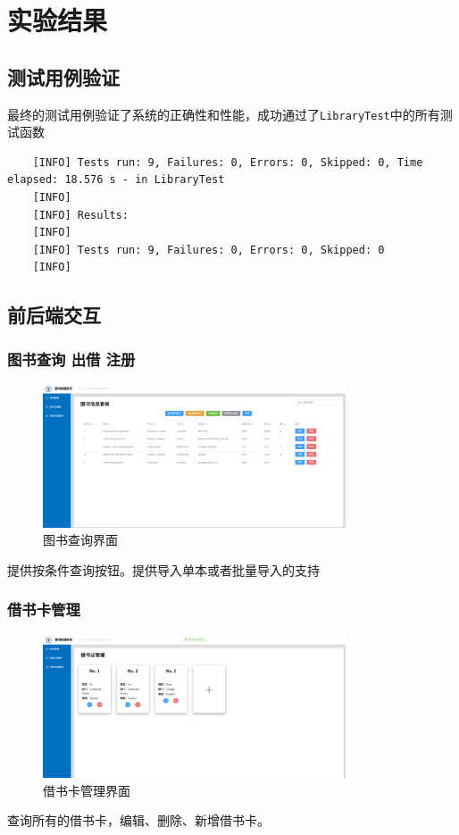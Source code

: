 \documentclass{ctexart}
\begin{document}
\section{实验结果}
\subsection{测试用例验证}
最终的测试用例验证了系统的正确性和性能，成功通过了\texttt{LibraryTest}中的所有测试函数
\begin{lstlisting}
    [INFO] Tests run: 9, Failures: 0, Errors: 0, Skipped: 0, Time elapsed: 18.576 s - in LibraryTest
    [INFO] 
    [INFO] Results:
    [INFO]
    [INFO] Tests run: 9, Failures: 0, Errors: 0, Skipped: 0
    [INFO]
\end{lstlisting}

\subsection{前后端交互}
\subsubsection{图书查询 出借 注册}
\begin{figure}[h]
    \centering
    \includegraphics[width=0.8\textwidth]{pic1.png}
    \caption{图书查询界面}
    \label{fig:book-query-borrow-register}
\end{figure}
提供按条件查询按钮。提供导入单本或者批量导入的支持
\subsubsection{借书卡管理}
\begin{figure}[h]
    \centering
    \includegraphics[width=0.8\textwidth]{pic2.png}
    \caption{借书卡管理界面}
    \label{fig:library-card-management}
\end{figure}
查询所有的借书卡，编辑、删除、新增借书卡。
\newpage
\end{document}
